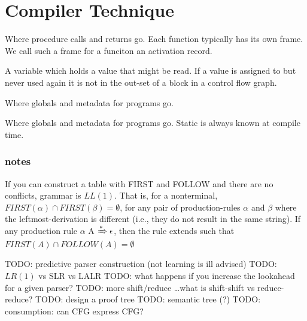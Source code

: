 \section{Compiler Technique}
\begin{definition}[LL]\label{def:LL}
\end{definition}

\begin{definition}\label{def:staticmemory}
    Where procedure calls and returns go. Each function typically has
    its own frame. We call such a frame for a funciton an activation record.
\end{definition}

\begin{definition}\label{def:livevariable}
    A variable which holds a value that might be read. If a value is assigned
    to but never used again it is not in the out-set of a block in a control
    flow graph.
\end{definition}

\begin{definition}\label{def:staticmemory}
    Where globals and metadata for programs go.
\end{definition}

\begin{definition}\label{def:staticmemory}
    Where globals and metadata for programs go. Static is always known at
    compile time.
\end{definition}

\subsubsection{notes}
If you can construct a table with FIRST and FOLLOW and there are no
conflicts, grammar is $LL(1)$. That is, for a nonterminal, $FIRST(\alpha) \cap FIRST(\beta) = \emptyset$, for any pair of production-rules $\alpha$ and $\beta$ where the leftmost-derivation is different (i.e., they do not result in the same string). If any production rule $\alpha$ A $\xRightarrow{*} \epsilon$, then the rule extends such that $FIRST(A) \cap FOLLOW(A) = \emptyset$
\usepackage{mathtools}
TODO: predictive parser construction (not learning is ill advised)
TODO: $LR(1)$ vs SLR vs LALR
TODO: what happens if you increase the lookahead for a given parser?
TODO: more shift/reduce \dots what is shift-shift vs reduce-reduce?
TODO: design a proof tree
TODO: semantic tree (?)
TODO: consumption: can CFG express CFG? 

